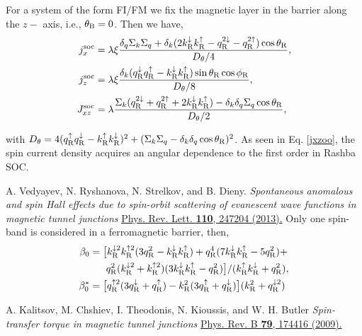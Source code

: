 \documentclass[10pt,pr,twocolumn,showpacs,amssymb,floatfix,superscriptaddress]{revtex4-1}
\newcommand{\dna}{\downarrow}
\newcommand{\nn}{\nonumber}
\newcommand{\upa}{\uparrow}
\newcommand{\dlt}{\delta}
\newcommand{\lam}{\lambda}
\newcommand{\Sg}{\Sigma}
\begin{document}
\begin{thebibliography}{999}
For a system of the form FI/FM we fix the magnetic layer in the barrier along the $z-$ axis, i.e., $\theta_{\rm B} = 0$. Then we have,
\begin{align}
\label{jxxoo}
j_{x}^{\rm soc} &=  \lam\xi \frac{ \dlt_q \Sg_k\Sg_q +\dlt_k(2k_{\rm R}^\dna k_{\rm R}^\upa-q_{\rm R}^{2\downarrow}-q_{\rm R}^{2\uparrow})\cos\theta_{\rm R}}{D_\theta/4}, \\
\label{jzzoo}
j_{z}^{\rm soc} &=\lam\xi \frac{\dlt_k(q_{\rm R}^\downarrow q_{\rm R}^\uparrow -k_{\rm R}^{\dna} k_{\rm R}^\upa )\sin \theta_{\rm R} \cos\phi_{\rm R}}{D_\theta/8} , \\
J_{xz}^{\rm soc} &=   \lam\frac{\Sg_k (q_{\rm R}^{2\downarrow}+q_{\rm R}^{2\uparrow}+2k_{\rm R}^\dna k_{\rm R}^\upa)-\dlt_k\dlt_q \Sg_q\cos\theta_{\rm R}}{D_\theta/2},  
\label{jxzoo}
\end{align}


with $D_\theta=4(q_{\rm R}^\uparrow q_{\rm R}^\downarrow-k_{\rm R}^\uparrow k_{\rm R}^\downarrow)^2+(\Sg_k \Sg_q -\dlt_k\dlt_q\cos\theta_{\rm R})^2$. As seen in Eq. \eqref{jxzoo}, the spin current density acquires an angular dependence to the first order in Rashba SOC.

 A. Vedyayev, N. Ryshanova, N. Strelkov, and B. Dieny. 
\textit{Spontaneous anomalous and spin Hall effects due to spin-orbit scattering of evanescent wave functions in magnetic tunnel junctions}
\href{https://doi.org/10.1103/PhysRevLett.110.247204}{Phys. Rev. Lett. {\bf 110}, 247204 (2013).}
Only one spin-band is considered in a ferromagnetic barrier, then,
\begin{align}
\beta_0 &= \big{[}k_{\rm R}^{\dna 2} k_{\rm R}^{\upa 2} ( 3 q_{\rm R}^2 - k_{\rm R}^{\dna } k_{\rm R}^{\upa }) +q_{\rm R}^4(  7 k_{\rm R}^\dna k_{\rm R}^\upa - 5 q_{\rm R}^2 )  +\nn\\
&  ~~~~~ q_{\rm R}^2(k_{\rm R}^{\dna 2} + k_{\rm R}^{\upa 2})(3 k_{\rm R}^\dna k_{\rm R}^\upa - q_{\rm R}^2)\big{]} / (k_{\rm R}^\upa k_{\rm R}^\dna + q_{\rm R}^2), \\
\beta_0^* &= \big{[}q_{\rm R}^{\upa 2} (3 q_{\rm R}^{\dna} + q_{\rm R}^\upa) - k_{\rm R}^2 (3 q_{\rm R}^\upa +q_{\rm R}^{\dna})\big{]} (k_{\rm R}^2 + q_{\rm R}^{\dna 2})  
\end{align}

 A. Kalitsov, M. Chshiev, I. Theodonis, N. Kioussis, and W. H. Butler
\textit{Spin-transfer torque in magnetic tunnel junctions}
\href{https://doi.org/10.1103/PhysRevB.79.174416}{Phys. Rev. B {\bf 79}, 174416 (2009).}


\end{thebibliography}
\end{document}
